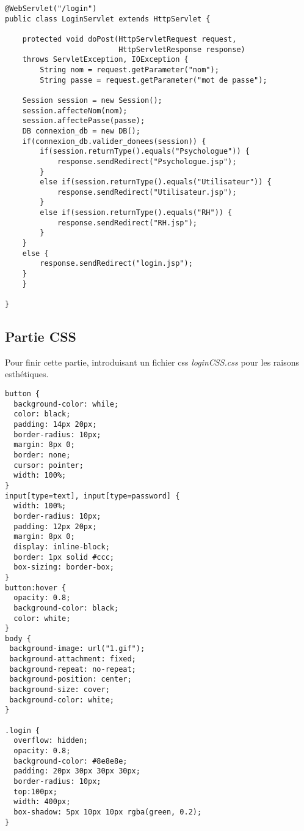 \documentclass[12]{article}
\begin{document}
\lstset{language=java}
\begin{lstlisting}
@WebServlet("/login")
public class LoginServlet extends HttpServlet {
	
	protected void doPost(HttpServletRequest request, 
						  HttpServletResponse response) 
	throws ServletException, IOException {
		String nom = request.getParameter("nom");
		String passe = request.getParameter("mot de passe");
		
	Session session = new Session();
	session.affecteNom(nom);
	session.affectePasse(passe);
	DB connexion_db = new DB();
	if(connexion_db.valider_donees(session)) {
		if(session.returnType().equals("Psychologue")) {
			response.sendRedirect("Psychologue.jsp");
		}
		else if(session.returnType().equals("Utilisateur")) {
			response.sendRedirect("Utilisateur.jsp");
		}
		else if(session.returnType().equals("RH")) {
			response.sendRedirect("RH.jsp");
		}
	}
	else {
		response.sendRedirect("login.jsp");
	}
	}

}
\end{lstlisting}


\subsection{Partie CSS}

Pour finir cette partie, introduisant un fichier css \textit{loginCSS.css} pour les raisons esthétiques.\\



\lstset{language=CSS}
\begin{lstlisting}
button {
  background-color: while;
  color: black;
  padding: 14px 20px;
  border-radius: 10px;
  margin: 8px 0;
  border: none;
  cursor: pointer;
  width: 100%;
}
input[type=text], input[type=password] {
  width: 100%;
  border-radius: 10px;
  padding: 12px 20px;
  margin: 8px 0;
  display: inline-block;
  border: 1px solid #ccc;
  box-sizing: border-box;
}
button:hover {
  opacity: 0.8;
  background-color: black;
  color: white;
}
body {
 background-image: url("1.gif");
 background-attachment: fixed;
 background-repeat: no-repeat;
 background-position: center;
 background-size: cover;
 background-color: white;
}

.login {
  overflow: hidden;
  opacity: 0.8;
  background-color: #8e8e8e;
  padding: 20px 30px 30px 30px;
  border-radius: 10px;
  top:100px;
  width: 400px;
  box-shadow: 5px 10px 10px rgba(green, 0.2);
}

\end{lstlisting}
\end{document}
